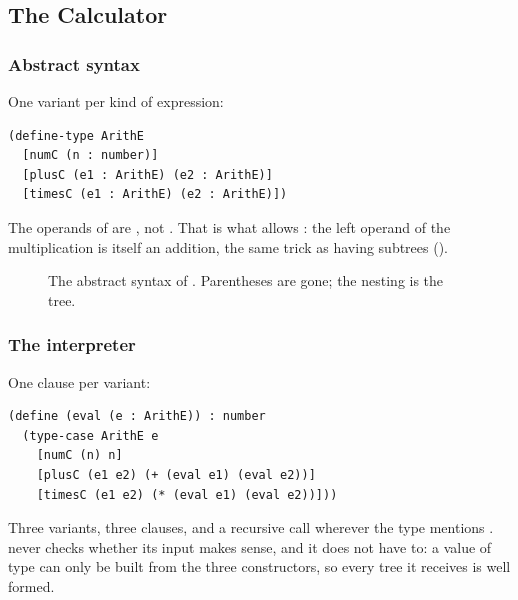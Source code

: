 \subsection{The Calculator}

\subsubsection{Abstract syntax} One variant per kind of expression:
\begin{lstlisting}
(define-type ArithE
  [numC (n : number)]
  [plusC (e1 : ArithE) (e2 : ArithE)]
  [timesC (e1 : ArithE) (e2 : ArithE)])
\end{lstlisting}
The operands of  are , not . That is what allows : the left operand of the multiplication is itself an addition, the same trick as  having subtrees ().

\begin{figure}[htbp]
\centering
{}
\caption{The abstract syntax of . Parentheses are gone; the nesting is the tree.}
\label{fig:calcast}
\end{figure}

\subsubsection{The interpreter} One clause per variant:
\begin{lstlisting}
(define (eval (e : ArithE)) : number
  (type-case ArithE e
    [numC (n) n]
    [plusC (e1 e2) (+ (eval e1) (eval e2))]
    [timesC (e1 e2) (* (eval e1) (eval e2))]))
\end{lstlisting}
Three variants, three clauses, and a recursive call wherever the type mentions .  never checks whether its input makes sense, and it does not have to: a value of type  can only be built from the three constructors, so every tree it receives is well formed.

